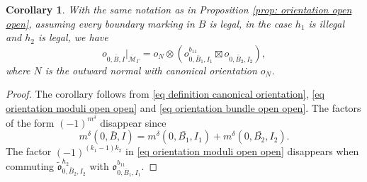 \documentclass[11pt,a4paper]{article}
\newtheorem{cor}[dummy]{Corollary}
\theoremstyle{definition}
\theoremstyle{remark}
\numberwithin{equation}{section}
\def\Mbar{{\overline{\mathcal M}}}
\begin{document}
\begin{cor}\label{cor:orientation open open}
    With the same notation as in Proposition \ref{prop: orientation open open}, assuming every boundary marking in $B$ is legal, in the case $h_1$ is illegal and $h_2$ is legal, we have 
    \begin{equation}
        {{o}}^{}_{0,\bar B,I}\big |_{\Mbar_\Gamma^{}}=o_N\otimes\left(
         {{o}}^{b_{11}}_{0,\bar B_1,I_1}\boxtimes{{o}}^{}_{0,\bar B_2,I_2}\right),
         \end{equation}
         where $N$ is the outward normal with canonical orientation $o_N$.
\end{cor}
\begin{proof}
    The corollary follows from \eqref{eq definition canonical orientation}, \eqref{eq orientation moduli open open} and \eqref{eq orientation bundle open open}.  The factors of the form $(-1)^{m^\delta}$ disappear since
    $$
        m^\delta(0,\bar{B},I)=m^\delta(0,\bar{B_1},I_1)+m^\delta(0,\bar{B_2},I_2).
    $$
    The factor $(-1)^{(k_1-1)k_2}$ in \eqref{eq orientation moduli open open} disappears when commuting $\tilde{\mathfrak{o}}^{h_2}_{0,\bar B_2,I_2}$ with ${\mathfrak{o}}^{b_{11}}_{0,\bar B_1,I_1}$.
\end{proof}

  
\end{document}
